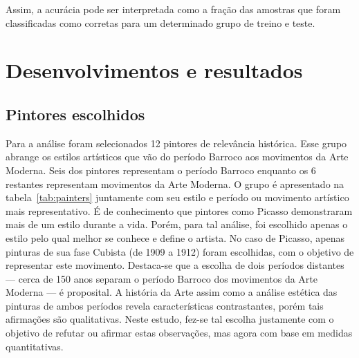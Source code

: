 Assim, a acurácia pode ser interpretada como a fração das amostras que
foram classificadas como corretas para um determinado grupo de treino
e teste.


\afterpage{\blankpage}
\chapter{Desenvolvimentos e resultados}
\label{chap:resultados}


\section{Pintores escolhidos}

Para a análise foram selecionados 12 pintores de relevância
histórica. Esse grupo abrange os estilos artísticos que vão do período
Barroco aos movimentos da Arte Moderna. Seis dos pintores representam
o período Barroco enquanto os 6 restantes representam movimentos da
Arte Moderna. O grupo é apresentado na tabela~\ref{tab:painters}
juntamente com seu estilo e período ou movimento artístico mais
representativo. É de conhecimento que pintores como Picasso
demonstraram mais de um estilo durante a vida. Porém, para tal
análise, foi escolhido apenas o estilo pelo qual melhor se conhece e
define o artista. No caso de Picasso, apenas pinturas de sua fase
Cubista (de 1909 a 1912) foram escolhidas, com o objetivo de
representar este movimento. Destaca-se que a escolha de dois períodos
distantes --- cerca de 150 anos separam o período Barroco dos
movimentos da Arte Moderna --- é proposital. A história da Arte assim
como a análise estética das pinturas de ambos períodos revela
características contrastantes, porém tais afirmações são
qualitativas. Neste estudo, fez-se tal escolha justamente com o
objetivo de refutar ou afirmar estas observações, mas agora com base
em medidas quantitativas.


